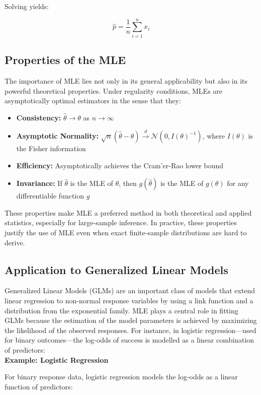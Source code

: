 \documentclass{book}
\begin{document}
Solving yields:

\[
\hat{p} = \frac{1}{n} \sum_{i=1}^{n} x_i
\]

\subsection{Properties of the MLE}

The importance of MLE lies not only in its general applicability but also in its powerful theoretical properties. 
Under regularity conditions, MLEs are asymptotically optimal estimators in the sense that they:
\begin{itemize}
\item \textbf{Consistency:} $\hat{\theta} \to \theta$ as $n \to \infty$
\item \textbf{Asymptotic Normality:} $\sqrt{n}(\hat{\theta} - \theta) \xrightarrow{d} \mathcal{N}(0, I(\theta)^{-1})$, where $I(\theta)$ is the Fisher information
\item \textbf{Efficiency:} Asymptotically achieves the Cram'er-Rao lower bound
\item \textbf{Invariance:} If $\hat{\theta}$ is the MLE of $\theta$, then $g(\hat{\theta})$ is the MLE of $g(\theta)$ for any differentiable function $g$
\end{itemize}
These properties make MLE a preferred method in both theoretical and applied statistics, especially for large-sample inference. 
In practice, these properties justify the use of MLE even when exact finite-sample distributions are hard to derive.

\subsection{Application to Generalized Linear Models}

Generalized Linear Models (GLMs) are an important class of models that extend linear regression to non-normal response variables by using a link function and a distribution from the exponential family. MLE plays a central role in fitting GLMs because the estimation of the model parameters is achieved by maximizing the likelihood of the observed responses.
For instance, in logistic regression---used for binary outcomes---the log-odds of success is modelled as a linear combination of predictors:\\

\textbf{Example: Logistic Regression}

For binary response data, logistic regression models the log-odds as a linear function of predictors:
\end{document}
